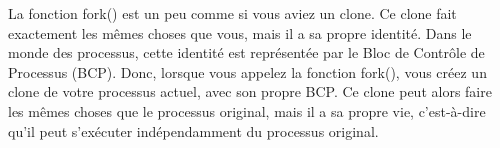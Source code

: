 \documentclass[12pt]{report}
\begin{document}
\begin{tcolorbox}[colback=blue!5, colframe=blue!75!black, title={\faLightbulb Vulgarisation simple}]
La fonction fork() est un peu comme si vous aviez un clone. Ce clone fait exactement les mêmes choses que vous, mais il a sa propre identité. Dans le monde des processus, cette identité est représentée par le Bloc de Contrôle de Processus (BCP). Donc, lorsque vous appelez la fonction fork(), vous créez un clone de votre processus actuel, avec son propre BCP. Ce clone peut alors faire les mêmes choses que le processus original, mais il a sa propre vie, c'est-à-dire qu'il peut s'exécuter indépendamment du processus original.
\end{tcolorbox}
\end{document}
